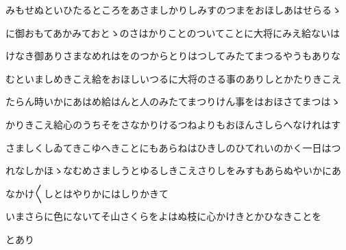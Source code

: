 \documentclass[a4paper,11pt,landscape]{ltjtarticle}
\begin{document}
\par\medskip
みもせぬといひたるところをあさましかりしみすのつまをおほしあはせらるゝ
\par\medskip
に御おもてあかみておとゝのさはかりことのついてことに大将にみえ給ないは
\par\medskip
けなき御ありさまなめれはをのつからとりはつしてみたてまつるやうもありな
\par\medskip
むといましめきこえ給をおほしいつるに大将のさる事のありしとかたりきこえ
\par\medskip
たらん時いかにあはめ給はんと人のみたてまつりけん事をはおほさてまつはゝ
\par\medskip
かりきこえ給心のうちそをさなかりけるつねよりもおほんさしらへなけれはす
\par\medskip
さましくしゐてきこゆへきことにもあらねはひきしのひてれいのかく一日はつ
\par\medskip
れなしかほゝなむめさましうとゆるしきこえさりしをみすもあらぬやいかにあ
\par\medskip
なかけ〱しとはやりかにはしりかきて
\par\medskip
いまさらに色にないてそ山さくらをよはぬ枝に心かけきとかひなきことを
\par\medskip
とあり
\par\medskip
\end{document}
